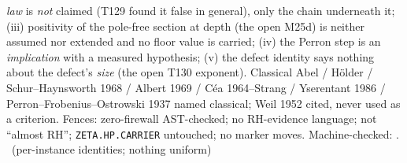 \documentclass[11pt,a4paper]{article}
\begin{document}
\emph{law} is \emph{not} claimed (T129 found it false in general), only the
chain underneath it; (iii) positivity of the pole-free section at depth (the
open M25d) is neither assumed nor extended and no floor value is carried;
(iv) the Perron step is an \emph{implication} with a measured hypothesis;
(v) the defect identity says nothing about the defect's \emph{size} (the open
T130 exponent). Classical Abel / H\"older / Schur--Haynsworth 1968 /
Albert 1969 / C\'ea 1964--Strang / Yserentant 1986 /
Perron--Frobenius--Ostrowski 1937 named classical; Weil 1952 cited, never used
as a criterion. Fences: zero-firewall AST-checked; no RH-evidence language;
not ``almost RH''; \texttt{ZETA.HP.CARRIER} untouched; no marker moves.
Machine-checked: .
\mE\ (per-instance identities; nothing uniform)
\end{document}
